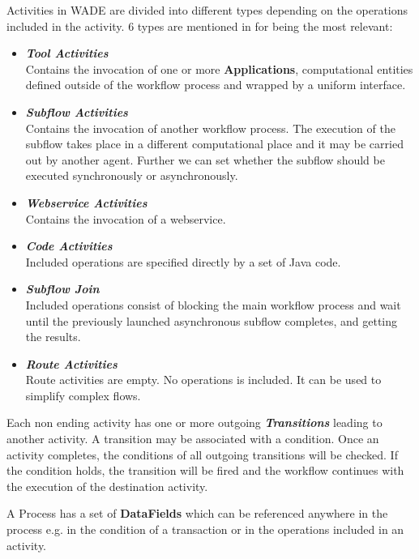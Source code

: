 Activities in WADE are divided into different types depending on the operations included in the activity. 6 types are mentioned in \cite{GCWADEUG10} for being the most relevant:
\begin{itemize}
	\item \textbf{\textit{Tool Activities}}\\
	      Contains the invocation of one or more \textbf{Applications}, computational entities defined outside of the workflow process and wrapped by a uniform interface.
	\item \textbf{\textit{Subflow Activities}}\\
	      Contains the invocation of another workflow process. The execution of the subflow takes place in a different computational place and it may be carried out by another agent. Further we can set whether the subflow should be executed synchronously or asynchronously.
	\item \textbf{\textit{Webservice Activities}}\\
				Contains the invocation of a webservice.
	\item \textbf{\textit{Code Activities}}\\
				Included operations are specified directly by a set of Java code. 
	\item \textbf{\textit{Subflow Join}} \\
	      Included operations consist of blocking the main workflow process and wait until the previously launched asynchronous subflow completes, and getting the results.
	\item \textbf{\textit{Route Activities}}\\
				Route activities are empty. No operations is included. It can be used to simplify complex flows. 
\end{itemize}
Each non ending activity has one or more outgoing \textbf{\textit{Transitions}} leading to another activity. A transition may be associated with a condition. Once an activity completes, the conditions of all outgoing transitions will be checked. If the condition holds, the transition will be fired and the workflow continues with the execution of the destination activity.

A Process has a set of \textbf{DataFields} which can be referenced anywhere in the process e.g. in the condition of a transaction or in the operations included in an activity. 
\\\\

